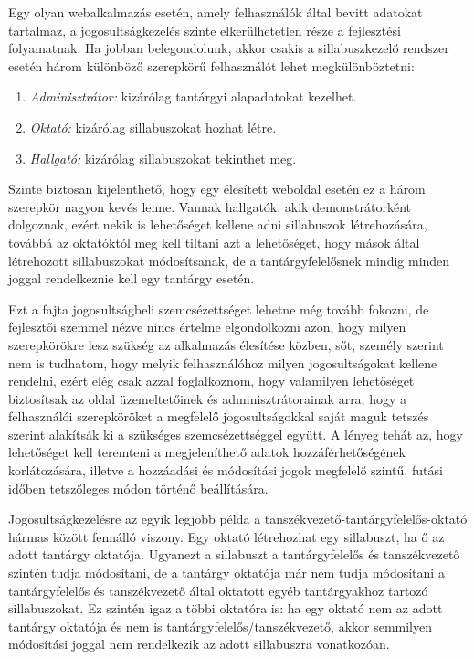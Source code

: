 \documentclass[hidelinks, 12pt, a4paper]{report}
\begin{document}
Egy olyan webalkalmazás esetén, amely felhasználók által bevitt adatokat tartalmaz, a jogosultságkezelés szinte elkerülhetetlen része a fejlesztési folyamatnak. Ha jobban belegondolunk, akkor csakis a sillabuszkezelő rendszer esetén három különböző szerepkörű felhasználót lehet megkülönböztetni:
\begin{enumerate}
\item \emph{Adminisztrátor:} kizárólag tantárgyi alapadatokat kezelhet.
\item \emph{Oktató:} kizárólag sillabuszokat hozhat létre.
\item \emph{Hallgató:} kizárólag sillabuszokat tekinthet meg.
\end{enumerate}
Szinte biztosan kijelenthető, hogy egy élesített weboldal esetén ez a három szerepkör nagyon kevés lenne. Vannak hallgatók, akik demonstrátorként dolgoznak, ezért nekik is lehetőséget kellene adni sillabuszok létrehozására, továbbá az oktatóktól meg kell tiltani azt a lehetőséget, hogy mások által létrehozott sillabuszokat módosítsanak, de a tantárgyfelelősnek mindig minden joggal rendelkeznie kell egy tantárgy esetén. 

Ezt a fajta jogosultságbeli szemcsézettséget lehetne még tovább fokozni, de fejlesztői szemmel nézve nincs értelme elgondolkozni azon, hogy milyen szerepkörökre lesz szükség az alkalmazás élesítése közben, sőt, személy szerint nem is tudhatom, hogy melyik felhasználóhoz milyen jogosultságokat kellene rendelni, ezért elég csak azzal foglalkoznom, hogy valamilyen lehetőséget biztosítsak az oldal üzemeltetőinek és adminisztrátorainak arra, hogy a felhasználói szerepköröket a megfelelő jogosultságokkal saját maguk tetszés szerint alakítsák ki a szükséges szemcsézettséggel együtt. A lényeg tehát az, hogy lehetőséget kell teremteni a megjeleníthető adatok hozzáférhetőségének korlátozására, illetve a hozzáadási és módosítási jogok megfelelő szintű, futási időben tetszőleges módon történő beállítására.

Jogosultságkezelésre az egyik legjobb példa a tanszékvezető-tantárgyfelelős-oktató hármas között fennálló viszony. Egy oktató létrehozhat egy sillabuszt, ha ő az adott tantárgy oktatója. Ugyanezt a sillabuszt a tantárgyfelelős és tanszékvezető szintén tudja módosítani, de a tantárgy oktatója már nem tudja módosítani a tantárgyfelelős és tanszékvezető által oktatott egyéb tantárgyakhoz tartozó sillabuszokat. Ez szintén igaz a többi oktatóra is: ha egy oktató nem az adott tantárgy oktatója és nem is tantárgyfelelős/tanszékvezető, akkor semmilyen módosítási joggal nem rendelkezik az adott sillabuszra vonatkozóan.
\end{document}
